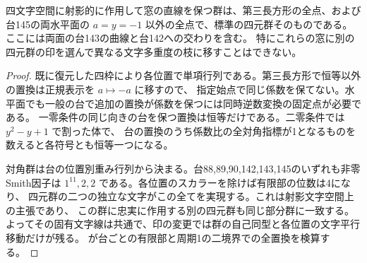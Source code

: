 \begin{proposition}\label{prop:rectangular-intrinsic-klein}
四文字空間に射影的に作用して窓の直線を保つ群は、第三長方形の全点、および
台145の両水平面の $a=y=-1$ 以外の全点で、標準の四元群そのものである。
ここには両面の台143の曲線と台142への交わりを含む。
特にこれらの窓に別の四元群の印を選んで異なる文字多重度の枝に移すことはできない。
\end{proposition}
\begin{proof}
既に復元した四枠により各位置で単項行列である。第三長方形で恒等以外の置換は正規表示を $a\mapsto-a$ に移すので、
指定始点で同じ係数を保てない。水平面でも一般の台で追加の置換が係数を保つには同時逆数変換の固定点が必要である。
一零条件の同じ向きの台を保つ置換は恒等だけである。二零条件では $y^2-y+1$ で割った体で、
台の置換のうち係数比の全対角指標が1となるものを数えると各符号とも恒等一つになる。

対角群は台の位置別重み行列から決まる。台88,89,90,142,143,145のいずれも非零Smith因子は
$1^{11},2,2$ である。各位置のスカラーを除けば有限部の位数は4になり、
四元群の二つの独立な文字がこの全てを実現する。これは射影文字空間上の主張であり、
この群に忠実に作用する別の四元群も同じ部分群に一致する。
よってその固有文字線は共通で、印の変更では群の自己同型と各位置の文字平行移動だけが残る。
 が台ごとの有限部と周期1の二境界での全置換を検算する。
\end{proof}
